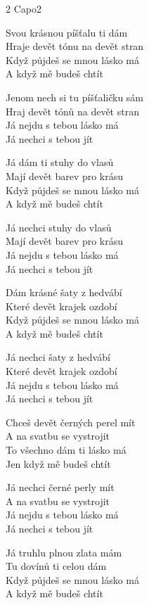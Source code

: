 \newpage
{}
\begin{multicols}{2}
\re{}Capo2


\ve
Svou krásnou píšťalu ti dám\\
Hraje devět tónu na devět stran\\
Když půjdeš se mnou lásko má\\
A když mě budeš chtít

\ve
Jenom nech si tu píšťaličku sám\\
Hraj devět tónů na devět stran\\
Já nejdu s tebou lásko má\\
Já nechci s tebou jít

\ve
Já dám ti stuhy do vlasů\\
Mají devět barev pro krásu\\
Když půjdeš se mnou lásko má\\
A když mě budeš chtít

\ve
Já nechci stuhy do vlasů\\
Mají devět barev pro krásu\\
Já nejdu s tebou lásko má\\
Já nechci s tebou jít

\ve
Dám krásné šaty z hedvábí\\
Které devět krajek ozdobí\\
Když půjdeš se mnou lásko má\\
A když mě budeš chtít

\ve
Já nechci šaty z hedvábí\\
Které devět krajek ozdobí\\
Já nejdu s tebou lásko má\\
Já nechci s tebou jít

\vfill\columnbreak\vspace*{\fill}

\ve
Chceš devět černých perel mít\\
A na svatbu se vystrojit\\
To všechno dám ti lásko má\\
Jen když mě budeš chtít

\ve
Já nechci černé perly mít\\
A na svatbu se vystrojit\\
Já nejdu s tebou lásko má\\
Já nechci s tebou jít

\ve
Já truhlu plnou zlata mám\\
Tu dovínů ti celou dám\\
Když půjdeš se mnou lásko má\\
A když mě budeš chtít


\end{multicols}
